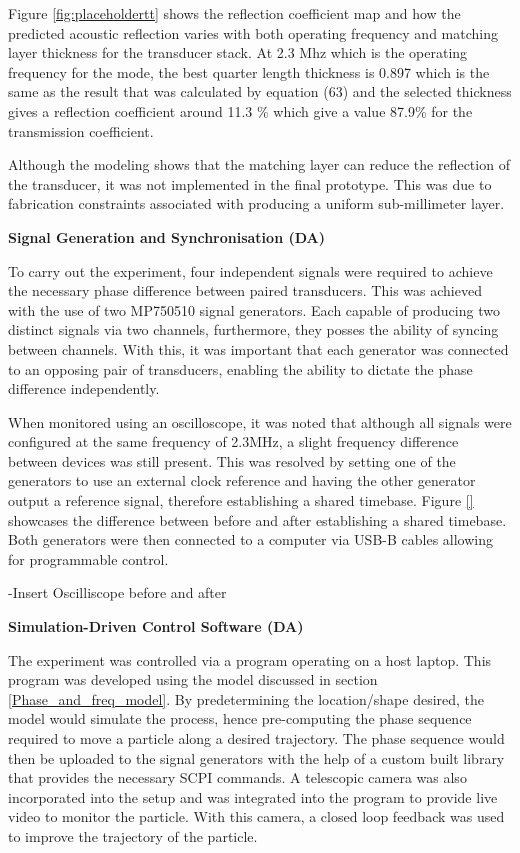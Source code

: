 \documentclass[11pt,a4paper]{article}
\newcommand{\subsubsubsection}[1]{%
  \par\medskip
  \noindent\textbf{#1}\par\nobreak\noindent\ignorespaces
}
\begin{document}
Figure \ref{fig:placeholdertt} shows the reflection coefficient map and how the predicted acoustic reflection varies with both operating frequency and matching layer thickness for the transducer stack. At 2.3 Mhz which is the operating frequency for the mode, the best quarter length thickness is 0.897 which is the same as the result that was calculated by equation (63) and the selected thickness gives a reflection coefficient around 11.3 $\%$ which give a value 87.9$\%$ for the transmission coefficient. 

Although the modeling shows that the matching layer can reduce the reflection of the transducer, it was not implemented in the final prototype. This was due to fabrication constraints associated with producing a uniform sub-millimeter layer.

\subsubsubsection{Signal Generation and Synchronisation (DA)}

To carry out the experiment, four independent signals were required to achieve the necessary phase difference between paired transducers. This was achieved with the use of two MP750510 signal generators. Each capable of producing two distinct signals via two channels, furthermore, they posses the ability of syncing between channels. With this, it was important that each generator was connected to an opposing pair of transducers, enabling the ability to dictate the phase difference independently. 

When monitored using an oscilloscope, it was noted that although all signals were configured at the same frequency of 2.3MHz, a slight frequency difference between devices was still present. This was resolved by setting one of the generators to use an external clock reference and having the other generator output a reference signal, therefore establishing a shared timebase. Figure \ref{} showcases the difference between before and after establishing a shared timebase. Both generators were then connected to a computer via USB-B cables allowing for programmable control.

-Insert Oscilliscope before and after

\subsubsubsection{Simulation-Driven Control Software (DA)}

The experiment was controlled via a program operating on a host laptop. This program was developed using the model discussed in section \ref{Phase_and_freq_model}. By predetermining the location/shape desired, the model would simulate the process, hence pre-computing the phase sequence required to move a particle along a desired trajectory. The phase sequence would then be uploaded to the signal generators with the help of a custom built library that provides the necessary SCPI commands. A telescopic camera was also incorporated into the setup and was integrated into the program to provide live video to monitor the particle. With this camera, a closed loop feedback was used to improve the trajectory of the particle. 
\end{document}
